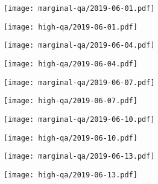 \documentclass{article}
\begin{document}
\begin{figure}[H]
	\ContinuedFloat
	\centering
	\begin{subfigure}{0.48\linewidth}
		\texttt{[image: marginal-qa/2019-06-01.pdf]}
	\end{subfigure}
	\begin{subfigure}{0.48\linewidth}
		\texttt{[image: high-qa/2019-06-01.pdf]}
	\end{subfigure}
	\begin{subfigure}{0.48\linewidth}
		\texttt{[image: marginal-qa/2019-06-04.pdf]}
	\end{subfigure}
	\begin{subfigure}{0.48\linewidth}
		\texttt{[image: high-qa/2019-06-04.pdf]}
	\end{subfigure}
	\begin{subfigure}{0.48\linewidth}
		\texttt{[image: marginal-qa/2019-06-07.pdf]}
	\end{subfigure}
	\begin{subfigure}{0.48\linewidth}
		\texttt{[image: high-qa/2019-06-07.pdf]}
	\end{subfigure}
	\begin{subfigure}{0.48\linewidth}
		\texttt{[image: marginal-qa/2019-06-10.pdf]}
	\end{subfigure}
	\begin{subfigure}{0.48\linewidth}
		\texttt{[image: high-qa/2019-06-10.pdf]}
	\end{subfigure}
	\begin{subfigure}{0.48\linewidth}
		\texttt{[image: marginal-qa/2019-06-13.pdf]}
	\end{subfigure}
	\begin{subfigure}{0.48\linewidth}
		\texttt{[image: high-qa/2019-06-13.pdf]}
	\end{subfigure}
\end{figure}
\end{document}
